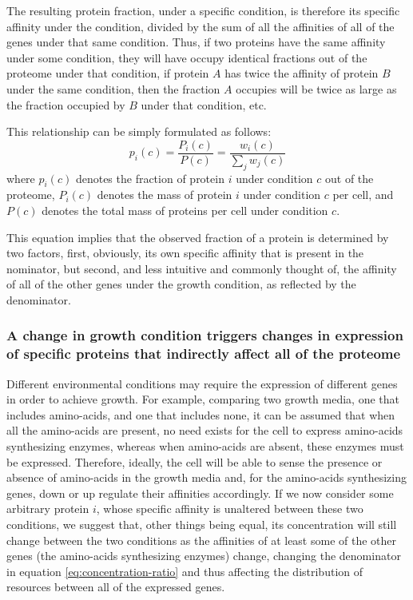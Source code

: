 \documentclass[notitlepage]{article}
\begin{document}
The resulting protein fraction, under a specific condition, is therefore its specific affinity under the condition, divided by the sum of all the affinities of all of the genes under that same condition.
Thus, if two proteins have the same affinity under some condition, they will have occupy identical fractions out of the proteome under that condition, if protein $A$ has twice the affinity of protein $B$ under the same condition, then the fraction $A$ occupies will be twice as large as the fraction occupied by $B$ under that condition, etc.

This relationship can be simply formulated as follows:
\begin{equation}
  \label{eq:concentration-ratio}
  p_i(c)=\frac{P_i(c)}{P(c)}=\frac{w_i(c)}{\sum_jw_j(c)}
\end{equation}
where $p_i(c)$ denotes the fraction of protein $i$ under condition $c$ out of the proteome, $P_i(c)$ denotes the mass of protein $i$ under condition $c$ per cell, and $P(c)$ denotes the total mass of proteins per cell under condition $c$.

This equation implies that the observed fraction of a protein is determined by two factors, first, obviously, its own specific affinity that is present in the nominator, but second, and less intuitive and commonly thought of, the affinity of all of the other genes under the growth condition, as reflected by the denominator.

\subsubsection{A change in growth condition triggers changes in expression of specific proteins that indirectly affect all of the proteome}
Different environmental conditions may require the expression of different genes in order to achieve growth.
For example, comparing two growth media, one that includes amino-acids, and one that includes none, it can be assumed that when all the amino-acids are present, no need exists for the cell to express amino-acids synthesizing enzymes, whereas when amino-acids are absent, these enzymes must be expressed.
Therefore, ideally, the cell will be able to sense the presence or absence of amino-acids in the growth media and, for the amino-acids synthesizing genes, down or up regulate their affinities accordingly.
If we now consider some arbitrary protein $i$, whose specific affinity is unaltered between these two conditions, we suggest that, other things being equal, its concentration will still change between the two conditions as the affinities of at least some of the other genes (the amino-acids synthesizing enzymes) change, changing the denominator in equation \ref{eq:concentration-ratio} and thus affecting the distribution of resources between all of the expressed genes.
\end{document}
